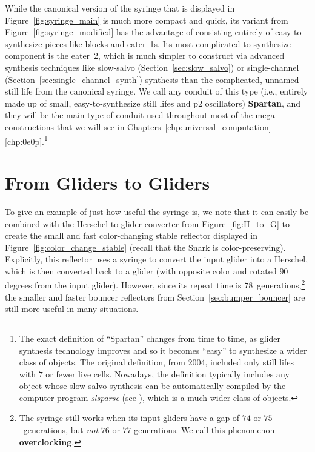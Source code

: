 While the canonical version of the syringe that is displayed in Figure~\ref{fig:syringe_main} is much more compact and quick, its variant from Figure~\ref{fig:syringe_modified} has the advantage of consisting entirely of easy-to-synthesize pieces like blocks and eater~1s. Its most complicated-to-synthesize component is the eater~2, which is much simpler to construct via advanced synthesis techniques like slow-salvo (Section~\ref{sec:slow_salvo}) or single-channel (Section~\ref{sec:single_channel_synth}) synthesis than the complicated, unnamed still life from the canonical syringe. We call any conduit of this type (i.e., entirely made up of small, easy-to-synthesize still lifes and p2 oscillators) \textbf{Spartan}, and they will be the main type of conduit used throughout most of the mega-constructions that we will see in Chapters~\ref{chp:universal_computation}--\ref{chp:0e0p}.\footnote{The exact definition of ``Spartan'' changes from time to time, as glider synthesis technology improves and so it becomes ``easy'' to synthesize a wider class of objects. The original definition, from 2004, included only still lifes with $7$ or fewer live cells. Nowadays, the definition typically includes any object whose slow salvo synthesis can be automatically compiled by the computer program \emph{slsparse} (see ), which is a much wider class of objects.}



\section{From Gliders to Gliders}\label{sec:from_gliders_to_gliders}

To give an example of just how useful the syringe is, we note that it can easily be combined with the Herschel-to-glider converter from Figure~\ref{fig:H_to_G} to create the small and fast color-changing stable reflector displayed in Figure~\ref{fig:color_change_stable} (recall that the Snark is color-preserving). Explicitly, this reflector uses a syringe to convert the input glider into a Herschel, which is then converted back to a glider (with opposite color and rotated $90$ degrees from the input glider). However, since its repeat time is $78$~generations,\footnote{The syringe still works when its input gliders have a gap of $74$ or $75$~generations, but \emph{not} $76$ or $77$ generations. We call this phenomenon \textbf{overclocking}.} the smaller and faster bouncer reflectors from Section~\ref{sec:bumper_bouncer} are still more useful in many situations.

